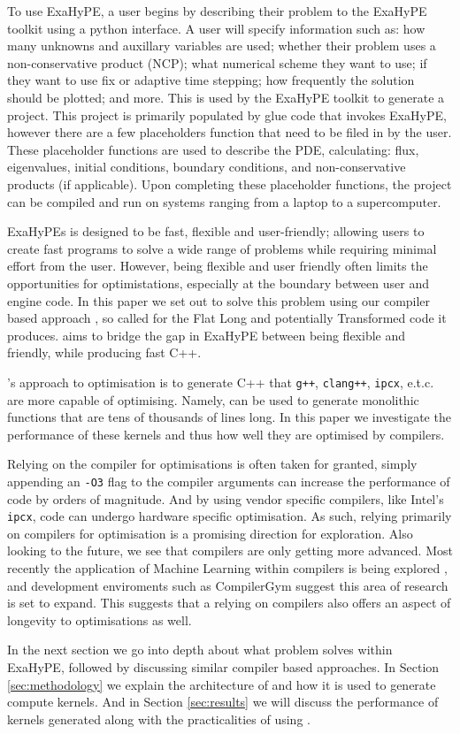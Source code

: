 To use ExaHyPE, a user begins by describing their problem to the ExaHyPE toolkit using a python interface.
A user will specify information such as: how many unknowns and auxillary variables are used; whether their problem uses a non-conservative product (NCP); what numerical scheme they want to use; if they want to use fix or adaptive time stepping; how frequently the solution should be plotted; and more.
This is used by the ExaHyPE toolkit to generate a project.
This project is primarily populated by glue code that invokes ExaHyPE, however there are a few placeholders function that need to be filed in by the user.
These placeholder functions are used to describe the PDE, calculating: flux, eigenvalues, initial conditions, boundary conditions, and non-conservative products (if applicable).
Upon completing these placeholder functions, the project can be compiled and run on systems ranging from a laptop to a supercomputer.

ExaHyPEs is designed to be fast, flexible and user-friendly; allowing users to create fast programs to solve a wide range of problems while requiring minimal effort from the user.
However, being flexible and user friendly often limits the opportunities for optimistations, especially at the boundary between user and engine code.
In this paper we set out to solve this problem using our compiler based approach \phlat, so called for the Flat Long and potentially Transformed code it produces.
\phlat aims to bridge the gap in ExaHyPE between being flexible and friendly, while producing fast C++.  

\phlat{}'s approach to optimisation is to generate C++ that \texttt{g++}, \texttt{clang++}, \texttt{ipcx}, e.t.c. are more capable of optimising.  
Namely, \phlat can be used to generate monolithic functions that are tens of thousands of lines long.
In this paper we investigate the performance of these kernels and thus how well they are optimised by compilers.

Relying on the compiler for optimisations is often taken for granted, simply appending an \texttt{-O3} flag to the compiler arguments can increase the performance of code by orders of magnitude.
And by using vendor specific compilers, like Intel's \texttt{ipcx}, code can undergo hardware specific optimisation.
As such, relying primarily on compilers for optimisation is a promising direction for exploration.
Also looking to the future, we see that compilers are only getting more advanced.
Most recently the application of Machine Learning within compilers is being explored \cite{compiler-ml-opt,lots-of-compiler-options}, and development enviroments such as CompilerGym \cite{compiler-gym} suggest this area of research is set to expand.
This suggests that a relying on compilers also offers an aspect of longevity to optimisations as well.

In the next section we go into depth about what problem \phlat solves within ExaHyPE, followed by discussing similar compiler based approaches.
In Section \ref{sec:methodology} we explain the architecture of \phlat and how it is used to generate compute kernels.
And in Section \ref{sec:results} we will discuss the performance of kernels generated along with the practicalities of using \phlat.